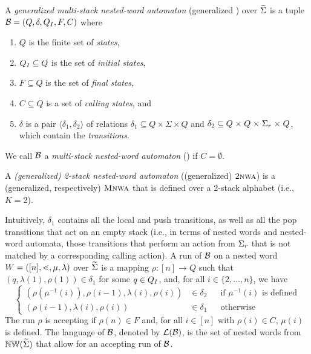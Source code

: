 \documentclass{LMCS}
\begin{document}
\begin{defi}
  A \emph{generalized multi-stack nested-word automaton} (generalized \MNWA)
  over $\widetilde{\Sigma}$ is a tuple $\mathcal{B}=(Q,\delta,Q_I,F,C)$ where
\begin{enumerate}[$\bullet$]
\item $Q$ is the finite set of \emph{states},
\item $Q_I \subseteq Q$ is the set of \emph{initial states},
\item $F \subseteq Q$ is the set of \emph{final states},
\item $C \subseteq Q$ is a set of \emph{calling states}, and
\item $\delta$ is a pair $\langle \delta_1,\delta_2 \rangle$ of relations
  $\delta_1 \mathrel{\subseteq} Q \mathrel{\times} \Sigma \mathrel{\times} Q$
  and $\delta_2 \mathrel{\subseteq} Q \mathrel{\times} Q \mathrel{\times}
  \Sigma_r \mathrel{\times} Q$, which contain the \emph{transitions}.
\end{enumerate}
We call $\mathcal{B}$ a \emph{multi-stack nested-word automaton} (\MNWA) if $C =
\emptyset$.

A \emph{(generalized) 2-stack nested-word automaton} ((generalized) $2\textsc{nwa}$)
is a (generalized, respectively) $\textsc{Mnwa}$ that is defined over a 2-stack
alphabet (i.e., $K=2$).
\end{defi}

Intuitively, $\delta_1$ contains all the local and push transitions, as well
as all the pop transitions that act on an empty stack (i.e., in terms of
nested words and nested-word automata, those transitions that perform an
action from $\Sigma_r$ that is not matched by a corresponding calling action).
A run of $\mathcal{B}$ on a nested word $W=([n],\mathord{\lessdot},\mu,\lambda)$ over
$\widetilde{\Sigma}$ is a mapping $\rho: [n] \rightarrow Q$ such that
$(q,\lambda(1),\rho(1)) \in \delta_1$ for some $q \in Q_I$, and, for all $i
\in \{2,\ldots,n\}$, we have
 \[\left\{
 \begin{array}{rll}
   (\rho(\mu^{-1}(i)),\rho(i-1),\lambda(i),\rho(i)) & \!\!\!\in \delta_2 &~~ \text{~if~}
   \mu^{-1}(i) \text{~is~defined}\\
   (\rho(i-1),\lambda(i),\rho(i)) & \!\!\!\in \delta_1 &~~ \text{~otherwise}
 \end{array}
\right.
 \]
 The run $\rho$ is accepting if $\rho(n) \in F$ and, for all $i \in [n]$ with
 $\rho(i) \in C$, $\mu(i)$ is defined. The language of $\mathcal{B}$, denoted by
 $\mathcal{L}(\mathcal{B})$, is the set of nested words from $\mathbb{NW}(\widetilde{\Sigma})$ that allow for
 an accepting run of $\mathcal{B}$.
\end{document}
